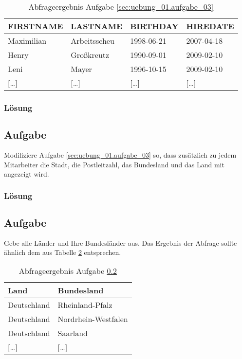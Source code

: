 \begin{table}[H]
  \begin{tabularx}{\textwidth}{X|X|X|X}
    \textbf{FIRSTNAME} & \textbf{LASTNAME} & \textbf{BIRTHDAY} & \textbf{HIREDATE} \\
    \hline\hline
    Maximilian & Arbeitsscheu & 1998-06-21 & 2007-04-18 \\
    Henry & Großkreutz & 1990-09-01 & 2009-02-10 \\
    Leni & Mayer & 1996-10-15 & 2009-02-10 \\
    $[$\dots$]$ & $[$\dots$]$ & $[$\dots$]$ & $[$\dots$]$ \\
  \end{tabularx}
  \caption{Abfrageergebnis Aufgabe \ref{sec:uebung_01.aufgabe_03}}
  \label{tbl:uebung_01.aufgabe_03}
\end{table}

\subsubsection*{Lösung}
\label{sec:uebung_01.aufgabe_03.loesung}

\subsection{Aufgabe}
\label{sec:uebung_01.aufgabe_04}
Modifiziere Aufgabe \ref{sec:uebung_01.aufgabe_03} so, dass zusätzlich zu jedem Mitarbeiter die Stadt, die Postleitzahl, das Bundesland und das Land mit angezeigt wird.

\subsubsection*{Lösung}
\label{sec:uebung_01.aufgabe_04.loesung}

\subsection{Aufgabe}
\label{sec:uebung_01.aufgabe_05}
Gebe alle Länder und Ihre Bundesländer aus. Das Ergebnis der Abfrage sollte ähnlich dem aus Tabelle \ref{tbl:uebung_01.aufgabe_05} entsprechen.

\begin{table}[H]
  \begin{tabularx}{\textwidth}{X|X}
    \textbf{Land} & \textbf{Bundesland} \\
    \hline\hline
    Deutschland & Rheinland-Pfalz \\
    Deutschland & Nordrhein-Westfalen \\
    Deutschland & Saarland \\
    $[$\dots$]$ & $[$\dots$]$ \\
  \end{tabularx}
  \caption{Abfrageergebnis Aufgabe \ref{sec:uebung_01.aufgabe_05}}
  \label{tbl:uebung_01.aufgabe_05}
\end{table}

